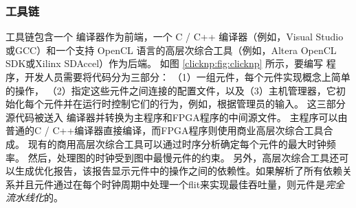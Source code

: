 \subsubsection{\name 工具链}
\label{clicknp:subsec:toolchain}
\name 工具链包含一个 \name 编译器作为前端，一个 C / C++ 编译器（例如，Visual Studio或GCC）和一个支持 OpenCL 语言的高层次综合工具（例如，Altera OpenCL SDK或Xilinx SDAccel）作为后端。
如图 \ref{clicknp:fig:clicknp} 所示，要编写 \name 程序，开发人员需要将代码分为三部分：
（1）一组元件，每个元件实现概念上简单的操作，
（2）指定这些元件之间连接的配置文件，以及（3）主机管理器，它初始化每个元件并在运行时控制它们的行为，例如，根据管理员的输入。
这三部分源代码被送入 \name 编译器并转换为主程序和FPGA程序的中间源文件。
主程序可以由普通的C / C++编译器直接编译，而FPGA程序则使用商业高层次综合工具合成。
现有的商用高层次综合工具可以通过时序分析确定每个元件的最大时钟频率。
然后，\name 处理图的时钟受到图中最慢元件的约束。
另外，高层次综合工具还可以生成优化报告，该报告显示元件中的操作之间的依赖性。如果解析了所有依赖关系并且元件通过在每个时钟周期中处理一个flit来实现最佳吞吐量，则元件是\textit {完全流水线化}的。

